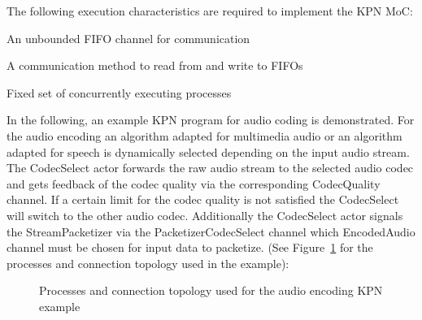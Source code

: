 
The following execution characteristics are required to
implement the KPN MoC:

\begin{characteristic}\label{characteristic-kpn-fifo}
  An unbounded FIFO channel for communication
\end{characteristic}

\begin{characteristic}\label{characteristic-kpn-fifo-read-write}
  A communication method to read from and write to FIFOs
\end{characteristic}

\begin{characteristic}\label{characteristic-kpn-concurrent-processes}
  Fixed set of concurrently executing processes
\end{characteristic}

In the following, an example KPN program for audio coding
is demonstrated. For the audio encoding an algorithm
adapted for multimedia audio or an algorithm adapted for speech
is dynamically selected depending on the input audio stream.
The CodecSelect actor forwards the raw audio stream to the
selected audio codec and gets feedback of the codec quality
via the corresponding CodecQuality channel. If a certain
limit for the codec quality is not satisfied the CodecSelect will
switch to the other audio codec. Additionally the CodecSelect actor
signals the StreamPacketizer via the PacketizerCodecSelect channel
which EncodedAudio channel must be chosen for input data to packetize.
(See Figure~\ref{fig:media-speech-audio-coding}
for the processes and connection topology used in the example):

\begin{figure}[h]
\centering
\resizebox{1.0\textwidth}{!}{}
\caption{Processes and connection topology used for the audio encoding KPN example}
\label{fig:media-speech-audio-coding}
\end{figure}


